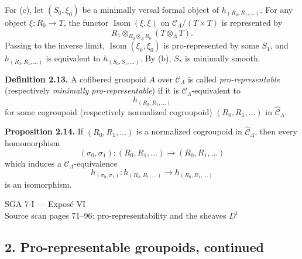 \documentclass[11pt]{article}
\providecommand{\Isom}{\operatorname{Isom}}
\providecommand{\Isom}{\operatorname{Isom}}
\providecommand{\id}{\operatorname{id}}
\begin{document}
For (c), let \((S_0,\xi_0)\) be a minimally versal formal object of
\(h_{(R_0,R_1,\ldots)}\). For any object \(\xi:R_0\to T\), the functor
\(\Isom(\xi,\xi)\) on \(\mathcal C_\Lambda/(T\times T)\) is represented by
\[
 R_1\otimes_{R_0\otimes_\Lambda R_0}(T\otimes_\Lambda T).
\]
Passing to the inverse limit, \(\Isom(\xi_0,\xi_0)\) is pro-represented by some \(S_1\), and
\(h_{(R_0,R_1,\ldots)}\) is equivalent to \(h_{(S_0,S_1,\ldots)}\). By (b), \(S_\ast\) is
minimally smooth.

\textbf{Definition 2.13.} A cofibered groupoid \(A\) over \(\mathcal C_\Lambda\) is called
\emph{pro-representable} (respectively \emph{minimally pro-representable}) if it is
\(\mathcal C_\Lambda\)-equivalent to
\[
 h_{(R_0,R_1,\ldots)}
\]
for some cogroupoid (respectively normalized cogroupoid)
\((R_0,R_1,\ldots)\) in \(\widehat{\mathcal C}_\Lambda\).

\textbf{Proposition 2.14.} If \((R_0,R_1,\ldots)\) is a normalized cogroupoid in
\(\widehat{\mathcal C}_\Lambda\), then every homomorphism
\[
 (\sigma_0,\sigma_1):(R_0,R_1,\ldots)\longrightarrow(R_0,R_1,\ldots)
\]
which induces a \(\mathcal C_\Lambda\)-equivalence
\[
 h_{(\sigma_0,\sigma_1)}:
 h_{(R_0,R_1,\ldots)}\longrightarrow h_{(R_0,R_1,\ldots)}
\]
is an isomorphism.



\providecommand{\Der}{\operatorname{Der}}
\providecommand{\Coker}{\operatorname{Coker}}
\providecommand{\Cov}{\operatorname{Cov}}
\providecommand{\Exalcomm}{\operatorname{Exalcomm}}
\providecommand{\id}{\operatorname{id}}
\providecommand{\cC}{\mathcal C}
\providecommand{\cH}{\mathcal H}
\providecommand{\cP}{\mathcal P}
\providecommand{\cE}{\mathcal E}
\providecommand{\what}{\widehat}
\providecommand{\wt}{\widetilde}
\providecommand{\mhat}{\widehat{\mathfrak m}}
\providecommand{\Rhat}{\widehat R}
\providecommand{\Ahat}{\widehat A}
\providecommand{\Bhat}{\widehat B}
\providecommand{\Ehat}{\widehat E}


\begin{center}
{\Large SGA 7-I — Exposé VI}\\[0.3em]
{\large Source scan pages 71--96: pro-representability and the sheaves \(D^i\)}
\end{center}

\subsection*{2. Pro-representable groupoids, continued}
\end{document}
